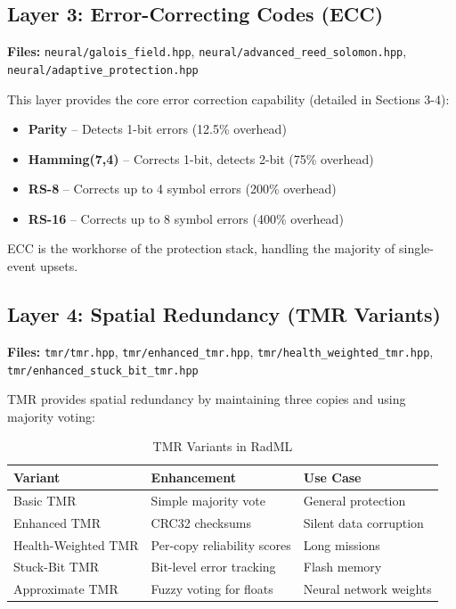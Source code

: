 \documentclass[11pt,a4paper]{article}
\begin{document}
\subsection{Layer 3: Error-Correcting Codes (ECC)}

\textbf{Files:} \texttt{neural/galois\_field.hpp}, \texttt{neural/advanced\_reed\_solomon.hpp}, \texttt{neural/adaptive\_protection.hpp}

This layer provides the core error correction capability (detailed in Sections 3-4):

\begin{itemize}
    \item \textbf{Parity} -- Detects 1-bit errors (12.5\% overhead)
    \item \textbf{Hamming(7,4)} -- Corrects 1-bit, detects 2-bit (75\% overhead)
    \item \textbf{RS-8} -- Corrects up to 4 symbol errors (200\% overhead)
    \item \textbf{RS-16} -- Corrects up to 8 symbol errors (400\% overhead)
\end{itemize}

ECC is the workhorse of the protection stack, handling the majority of single-event upsets.

\subsection{Layer 4: Spatial Redundancy (TMR Variants)}

\textbf{Files:} \texttt{tmr/tmr.hpp}, \texttt{tmr/enhanced\_tmr.hpp}, \texttt{tmr/health\_weighted\_tmr.hpp}, \texttt{tmr/enhanced\_stuck\_bit\_tmr.hpp}

TMR provides spatial redundancy by maintaining three copies and using majority voting:

\begin{table}[htbp]
\centering
\caption{TMR Variants in RadML}
\begin{tabular}{@{}lll@{}}
\toprule
\textbf{Variant} & \textbf{Enhancement} & \textbf{Use Case} \\
\midrule
Basic TMR & Simple majority vote & General protection \\
Enhanced TMR & CRC32 checksums & Silent data corruption \\
Health-Weighted TMR & Per-copy reliability scores & Long missions \\
Stuck-Bit TMR & Bit-level error tracking & Flash memory \\
Approximate TMR & Fuzzy voting for floats & Neural network weights \\
\bottomrule
\end{tabular}
\end{table}
\end{document}
